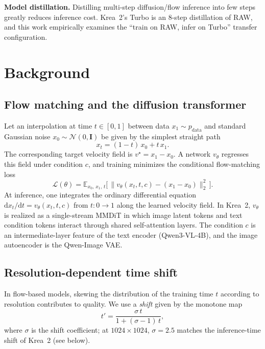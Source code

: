 \documentclass[10pt,twocolumn]{article}
\begin{document}
\textbf{Model distillation.} Distilling multi-step diffusion/flow inference into few steps greatly reduces inference cost. Krea~2's Turbo is an 8-step distillation of RAW, and this work empirically examines the ``train on RAW, infer on Turbo'' transfer configuration.

\section{Background}
\subsection{Flow matching and the diffusion transformer}
Let an interpolation at time $t\in[0,1]$ between data $x_1\sim p_{\text{data}}$ and standard Gaussian noise $x_0\sim\mathcal{N}(0,\mathbf I)$ be given by the simplest straight path
\begin{equation}
x_t=(1-t)\,x_0 + t\,x_1 .
\label{eq:interp}
\end{equation}
The corresponding target velocity field is $v^\star=x_1-x_0$. A network $v_\theta$ regresses this field under condition $c$, and training minimizes the conditional flow-matching loss
\begin{equation}
\mathcal{L}(\theta)=\mathbb{E}_{x_0,\,x_1,\,t}\Big[\,\big\lVert v_\theta(x_t,t,c)-(x_1-x_0)\big\rVert_2^2\,\Big].
\label{eq:fmloss}
\end{equation}
At inference, one integrates the ordinary differential equation $\mathrm{d}x_t/\mathrm{d}t=v_\theta(x_t,t,c)$ from $t:0\to1$ along the learned velocity field. In Krea~2, $v_\theta$ is realized as a single-stream MMDiT in which image latent tokens and text condition tokens interact through shared self-attention layers. The condition $c$ is an intermediate-layer feature of the text encoder (Qwen3-VL-4B), and the image autoencoder is the Qwen-Image VAE.

\subsection{Resolution-dependent time shift}
In flow-based models, skewing the distribution of the training time $t$ according to resolution contributes to quality. We use a \emph{shift} given by the monotone map
\begin{equation}
t' = \frac{\sigma\, t}{1+(\sigma-1)\,t},
\label{eq:shift}
\end{equation}
where $\sigma$ is the shift coefficient; at $1024\times1024$, $\sigma=2.5$ matches the inference-time shift of Krea~2 (see below).
\end{document}
